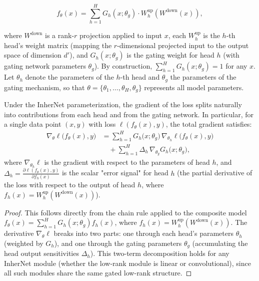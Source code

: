 \documentclass{article} %
\begin{document}
\begin{equation}
f_{\theta}(x) = \sum_{h=1}^H G_h(x;\theta_g) \cdot W^{\text{up}}_h(W^{\text{down}}(x)),
\end{equation}

where $W^{\text{down}}$ is a rank-$r$ projection applied to input $x$, each $W^{\text{up}}_h$ is the $h$-th head's weight matrix (mapping the $r$-dimensional projected input to the output space of dimension $d'$), and $G_h(x;\theta_g)$ is the gating weight for head $h$ (with gating network parameters $\theta_g$). By construction, $\sum_{h=1}^H G_h(x;\theta_g) = 1$ for any $x$. Let $\theta_h$ denote the parameters of the $h$-th head and $\theta_g$ the parameters of the gating mechanism, so that $\theta = \{\theta_1,\dots,\theta_H,\theta_g\}$ represents all model parameters.

\begin{lemma}
\label{lemma:gradient-decomposition_}
Under the InherNet parameterization, the gradient of the loss splits naturally into contributions from each head and from the gating network. In particular, for a single data point $(x,y)$ with loss $\ell(f_\theta(x),y)$, the total gradient satisfies:
\begin{equation}
\begin{aligned}
\nabla_\theta \ell\!\bigl(f_\theta(x),y\bigr)
&= \sum_{h=1}^H G_h\!\bigl(x;\theta_g\bigr)\,\nabla_{\theta_h}\ell\!\bigl(f_\theta(x),y\bigr) \\
&\quad + \sum_{h=1}^H \Delta_h\,\nabla_{\theta_g} G_h\!\bigl(x;\theta_g\bigr),
\end{aligned}
\end{equation}
where $\nabla_{\theta_h}\ell$ is the gradient with respect to the parameters of head $h$, and $\Delta_h = \frac{\partial \ell(f_\theta(x),y)}{\partial f_h(x)}$ is the scalar "error signal" for head $h$ (the partial derivative of the loss with respect to the output of head $h$, where $f_h(x) = W^{\text{up}}_h(W^{\text{down}}(x))$).
\end{lemma}

\begin{proof}
This follows directly from the chain rule applied to the composite model $f_\theta(x) = \sum_{h=1}^H G_h(x;\theta_g)f_h(x)$, where $f_h(x) = W^{\text{up}}_h(W^{\text{down}}(x))$. The derivative $\nabla_{\theta}\ell$ breaks into two parts: one through each head's parameters $\theta_h$ (weighted by $G_h$), and one through the gating parameters $\theta_g$ (accumulating the head output sensitivities $\Delta_h$). This two-term decomposition holds for any InherNet module (whether the low-rank module is linear or convolutional), since all such modules share the same gated low-rank structure.
\end{proof}
\end{document}
